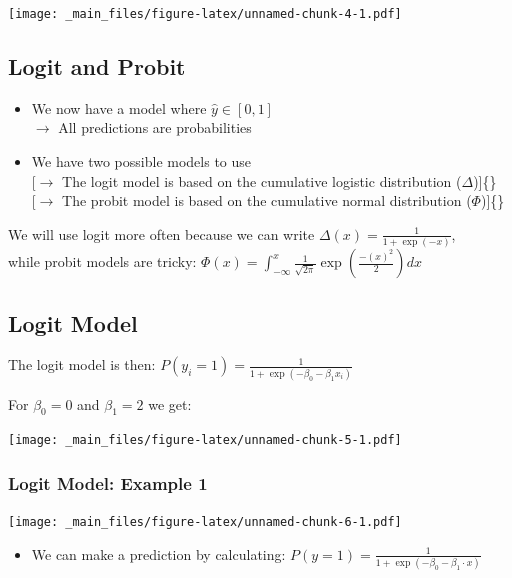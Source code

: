 \documentclass[]{article}
\providecommand{\tightlist}{%
  \setlength{\itemsep}{0pt}\setlength{\parskip}{0pt}}
\theoremstyle{definition}
\theoremstyle{definition}
\theoremstyle{remark}
\begin{document}
\texttt{[image: \_main\_files/figure-latex/unnamed-chunk-4-1.pdf]}

\subsection{Logit and Probit}\label{logit-and-probit}

\begin{itemize}
\item
  We now have a model where \(\hat y \in [0,1]\)\\
  \(\rightarrow\) All predictions are probabilities
\item
  We have two possible models to use\\
  {[}\(\rightarrow\) The logit model is based on the cumulative logistic
  distribution (\(\Delta\)){]}\{\}\\
  {[}\(\rightarrow\) The probit model is based on the cumulative normal
  distribution (\(\Phi\)){]}\{\}
\end{itemize}

We will use logit more often because we can write
\(\Delta(x) = \frac{1}{1 + \exp(-x)}\),\\
while probit models are tricky:
\(\Phi(x) = \int_{-\infty}^{x}\frac{1}{\sqrt{2\pi}}\exp(\frac{-(x)^2}{2}) dx\)

\subsection{Logit Model}\label{logit-model}

The logit model is then:
\(P(y_i=1)=\frac{1}{1 + \exp(-\beta_0 - \beta_1 x_i)}\)

For \(\beta_0 = 0\) and \(\beta_1=2\) we get:

\texttt{[image: \_main\_files/figure-latex/unnamed-chunk-5-1.pdf]}

\subsubsection{Logit Model: Example 1}\label{logit-model-example-1}

\texttt{[image: \_main\_files/figure-latex/unnamed-chunk-6-1.pdf]}

\begin{itemize}
\tightlist
\item
  We can make a prediction by calculating:
  \(P(y=1) = \frac{1}{1+\exp(-\beta_0 - \beta_1\cdot x)}\)
\end{itemize}
\end{document}
